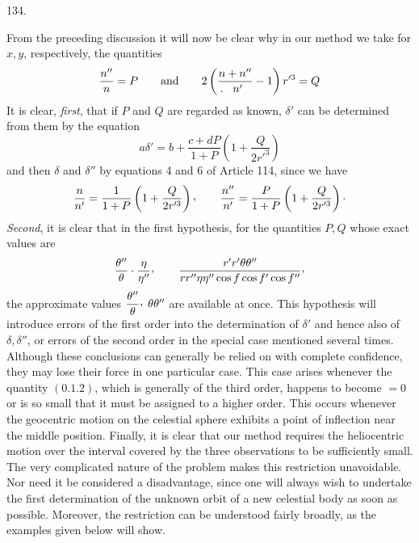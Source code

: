 \par{}\medskip
\begin{center}\hypertarget{native-180-article134}{}134.\end{center}
From the preceding discussion it will now be clear why in our method we take for $x,y$,
respectively, the quantities
\[
\frac{n''}{n}=P\qquad\text{and}\qquad
2\left(\frac{n+n''}{\mathpunct{\mkern-12mu.\mkern12mu}n'}-1\right)r'^3=Q
\]
It is clear, \textit{first}, that if $P$ and $Q$ are regarded as known, $\delta'$ can be
determined from them by the equation
\[
a\delta'=b+\frac{c+dP}{1+P}\left(1+\frac{Q}{2r'^3}\right)
\]
and then $\delta$ and $\delta''$ by equations 4 and 6 of Article 114, since we have
\[
\frac{n}{n'}=\frac{1}{1+P}\left(1+\frac{Q}{2r'^3}\right)\mathpunct{\raisebox{.45ex}{,}}\qquad
\frac{n''}{n'}=\frac{P}{1+P}\left(1+\frac{Q}{2r'^3}\right)\mathpunct{\cdot}
\]
\textit{Second}, it is clear that in the first hypothesis, for the quantities $P,Q$ whose exact
values are
\hypertarget{native-181}{}
\[
\frac{\theta''}{\theta}\cdot\frac{\eta}{\eta''}\mathpunct{\raisebox{.45ex}{,}}\qquad
\frac{r'r'\theta\theta''}{rr''\eta\eta''\cos f\cos f'\cos f''}\mathpunct{\raisebox{.45ex}{,}}
\]
the approximate values $\dfrac{\theta''}{\theta}\mathpunct{\raisebox{.45ex}{,}}\;\theta\theta''$ are available at once. This hypothesis will introduce errors of
the first order into the determination of $\delta'$ and hence also of $\delta,\delta''$, or errors of the
second order in the special case mentioned several times. Although these conclusions can
generally be relied on with complete confidence, they may lose their force in one particular
case. This case arises whenever the quantity $(0.1.2)$, which is generally of the third order,
happens to become $=0$ or is so small that it must be assigned to a higher order. This occurs
whenever the geocentric motion on the celestial sphere exhibits a point of inflection near the
middle position. Finally, it is clear that our method requires the heliocentric motion over the
interval covered by the three observations to be sufficiently small. The very complicated nature
of the problem makes this restriction unavoidable. Nor need it be considered a disadvantage,
since one will always wish to undertake the first determination of the unknown orbit of a new
celestial body as soon as possible. Moreover, the restriction can be understood fairly broadly,
as the examples given below will show.
